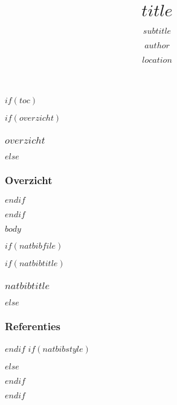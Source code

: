 \documentclass[$if(fontsize)$$fontsize$$else$10pt$endif$, $if(handout)$handout,$endif$ xetex]{beamer}
\title{$title$}
\subtitle{$subtitle$}
\author{$author$}
\institute{$institute$}
\date{$location$}
\date{}
\begin{document}
\begin{frame}[plain]
  \titlepage
\end{frame}

$if(toc)$
\begin{frame}
$if(overzicht)$
  \frametitle{$overzicht$}
$else$
  \frametitle{Overzicht}
$endif$
	\tableofcontents
\end{frame}
$endif$

$body$

$if(natbibfile)$
\begin{frame}
$if(natbibtitle)$
\frametitle{$natbibtitle$}
$else$
\frametitle{Referenties}
$endif$
$if(natbibstyle)$

$else$

$endif$
  
\end{frame}
$endif$
\end{document}
